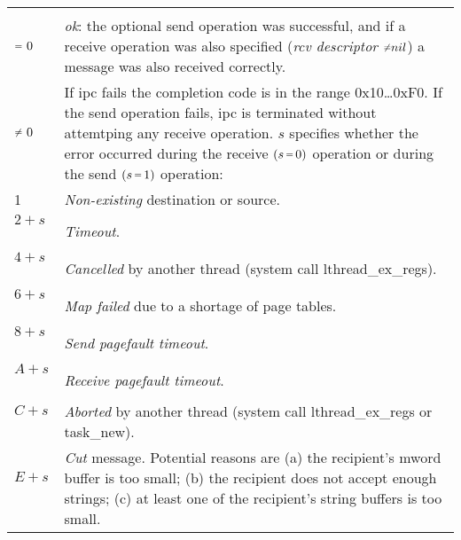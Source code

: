 \documentclass[a4paper,11pt,twoside,dvips]{book}
\makeatletter
\newcommand{\smaller}[1]{{\mathchoice 
           {\raisebox{1pt}{$\scriptstyle #1$}} 
           {\raisebox{1pt}{$\scriptstyle #1$}} 
           {\raisebox{0.5pt}{$\scriptscriptstyle #1$}} 
           {\raisebox{0.5pt}{$\scriptscriptstyle #1$}} 
}}
\newcommand{\EQ}{\smaller{=}}
\newcommand{\NE}{\smaller{\neq}}
\newlength{\Up}\setlength{\Up}{-\baselineskip}
\newlength{\Params}
\newenvironment{param}[1] 
{%
\setlength{\Params}{\textwidth}\addtolength{\Params}{-140pt}%
\par\vspace{5pt}%
\noindent\begin{minipage}{\textwidth} 
\noindent {\em #1}\\[\Up]%
\noindent\begin{tabular}{@{\hspace*{75pt}}lp{\Params}}%
\hspace*{30pt}&\\[\Up]%
} 
{%
\end{tabular}\end{minipage}\par\vspace{5pt}%
}
\makeatother
\begin{document}
~	%

\begin{param}{ec} 
     $ \EQ\ 0$         &  {\em ok}: the optional send operation
                          was successful, and if a receive operation was also
                          specified ({\em rcv descriptor $\NE nil$}) a
                          message was also received correctly.\\[5pt] 
% 
     $    \NE\ 0$      &  If ipc fails the completion code is in
                          the range 0x10\dots 0xF0. If the send operation
                          fails, ipc is terminated without
                          attemtping any receive operation.
                          $s$ specifies whether the error occurred
                          during the receive $(s\,\EQ\,0)$ operation or
                          during the send $(s\,\EQ\,1)$ operation:\\[5pt] %
% 
 \hspace*{\fill}1     &   {\em Non-existing} destination or source.\\[5pt] 
%
 \hspace*{\fill}$2+s$~&  {\em Timeout}.\\[5pt] 
% 
 \hspace*{\fill}$4+s$~&  {\em Cancelled} by another thread (system call
                         lthread\_ex\_regs).\\[5pt] 
% 
 \hspace*{\fill}$6+s$~&  {\em Map failed} due to a shortage of page
 tables.\\[5pt] 
% 
 \hspace*{\fill}$8+s$~&  {\em Send pagefault timeout}.\\[5pt] 
% 
 \hspace*{\fill}$A+s$~&  {\em Receive pagefault timeout}.\\[5pt] 
% 
 \hspace*{\fill}$C+s$~&  {\em Aborted} by another thread (system call
                         lthread\_ex\_regs or task\_new).\\[5pt] 
% 
 \hspace*{\fill}$E+s$~&  {\em Cut} message. Potential reasons are (a) the
                         recipient's mword buffer is too small; (b) the
                         recipient does not accept enough strings; 
                         (c) at least one of the recipient's string
                         buffers is too small.\\[8pt]
% 
% 

\end{param}
\end{document}
